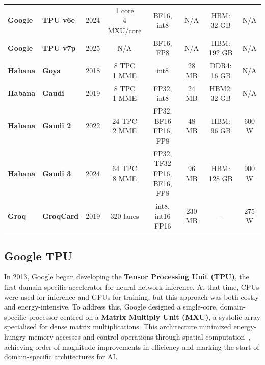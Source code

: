 \begin{table}[h!]
\begin{tabularx}{\textwidth}{l l c c c c c c}
\textbf{Google}
& \textbf{TPU v6e} & 2024 & \makecell[l]{1 core \\ 4 MXU/core} & BF16, int8 
& N/A & HBM: 32 GB & N/A \\

\textbf{Google}
& \textbf{TPU v7p} & 2025 & N/A & BF16, FP8 
& N/A & HBM: 192 GB & N/A \\

\midrule

\textbf{Habana}
& \textbf{Goya}    & 2018 & \makecell[l]{8 TPC \\ 1 MME} 
& int8 
& 28 MB & DDR4: 16 GB & N/A \\

\textbf{Habana}
& \textbf{Gaudi}   & 2019 & \makecell[l]{8 TPC \\ 1 MME} 
& FP32, int8 
& 24 MB & HBM2: 32 GB & N/A \\

\textbf{Habana}
& \textbf{Gaudi 2} & 2022 & \makecell[l]{24 TPC \\ 2 MME} 
& \makecell[l]{FP32, BF16 \\ FP16, FP8} 
& 48 MB & HBM: 96 GB & 600 W \\

\textbf{Habana}
& \textbf{Gaudi 3} & 2024 & \makecell[l]{64 TPC \\ 8 MME} 
& \makecell[l]{FP32, TF32 \\ FP16, BF16, FP8} 
& 96 MB & HBM: 128 GB & 900 W \\

\midrule

\textbf{Groq}
& \textbf{GroqCard} & 2019 & 320 lanes 
& \makecell[l]{int8, int16 \\ FP16} 
& 230 MB & -- & 275 W \\

\bottomrule
\end{tabularx}
\end{table}

\subsection{Google TPU}
\label{chap:background:sec:tpu}

In 2013, Google began developing the \textbf{Tensor Processing Unit (TPU)}, the first domain-specific accelerator for neural network inference. At that time, CPUs were used for inference and GPUs for training, but this approach was both costly and energy-intensive. To address this, Google designed a single-core, domain-specific processor centred on a \textbf{Matrix Multiply Unit (MXU)}, a systolic array specialised for dense matrix multiplications. This architecture minimized energy-hungry memory accesses and control operations through spatial computation~\cite{jouppi2018motivation}, achieving order-of-magnitude improvements in efficiency and marking the start of domain-specific architectures for AI.


